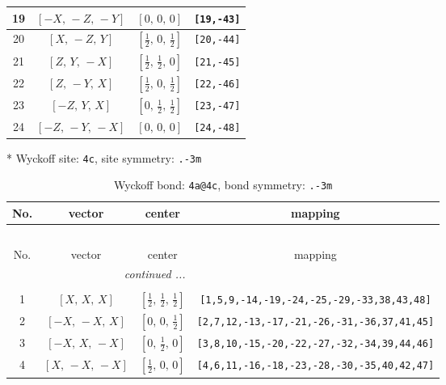 \documentclass[fleqn,8pt]{jsarticle}
\begin{document}
\begin{longtable}{cccc}
19 & $\left[ - X,\, - Z,\, - Y \right]$ & $\left[ 0,\, 0,\, 0 \right]$ & {\tt [19,-43]} \\ \hline
20 & $\left[ X,\, - Z,\, Y \right]$ & $\left[ \frac{1}{2},\, 0,\, \frac{1}{2} \right]$ & {\tt [20,-44]} \\ \hline
21 & $\left[ Z,\, Y,\, - X \right]$ & $\left[ \frac{1}{2},\, \frac{1}{2},\, 0 \right]$ & {\tt [21,-45]} \\ \hline
22 & $\left[ Z,\, - Y,\, X \right]$ & $\left[ \frac{1}{2},\, 0,\, \frac{1}{2} \right]$ & {\tt [22,-46]} \\ \hline
23 & $\left[ - Z,\, Y,\, X \right]$ & $\left[ 0,\, \frac{1}{2},\, \frac{1}{2} \right]$ & {\tt [23,-47]} \\ \hline
24 & $\left[ - Z,\, - Y,\, - X \right]$ & $\left[ 0,\, 0,\, 0 \right]$ & {\tt [24,-48]} \\
\end{longtable}
* Wyckoff site: {\tt 4c}, site symmetry: {\tt .-3m}
\renewcommand{\arraystretch}{1.2}
\begin{longtable}{cccc}
\caption{Wyckoff bond: {\tt 4a@4c}, bond symmetry: {\tt .-3m}}
 \\
 \hline \hline
No. & vector & center & mapping \\ \hline \endfirsthead

\multicolumn{3}{l}{\tablename\ \thetable{}} \\
 \hline \hline
No. & vector & center & mapping \\ \hline \endhead

 \hline \hline
\multicolumn{3}{r}{\footnotesize\it continued ...} \\ \endfoot

 \hline \hline
\multicolumn{3}{r}{} \\ \endlastfoot

1 & $\left[ X,\, X,\, X \right]$ & $\left[ \frac{1}{2},\, \frac{1}{2},\, \frac{1}{2} \right]$ & {\tt [1,5,9,-14,-19,-24,-25,-29,-33,38,43,48]} \\ \hline
2 & $\left[ - X,\, - X,\, X \right]$ & $\left[ 0,\, 0,\, \frac{1}{2} \right]$ & {\tt [2,7,12,-13,-17,-21,-26,-31,-36,37,41,45]} \\ \hline
3 & $\left[ - X,\, X,\, - X \right]$ & $\left[ 0,\, \frac{1}{2},\, 0 \right]$ & {\tt [3,8,10,-15,-20,-22,-27,-32,-34,39,44,46]} \\ \hline
4 & $\left[ X,\, - X,\, - X \right]$ & $\left[ \frac{1}{2},\, 0,\, 0 \right]$ & {\tt [4,6,11,-16,-18,-23,-28,-30,-35,40,42,47]} \\
\end{longtable}
\end{document}
